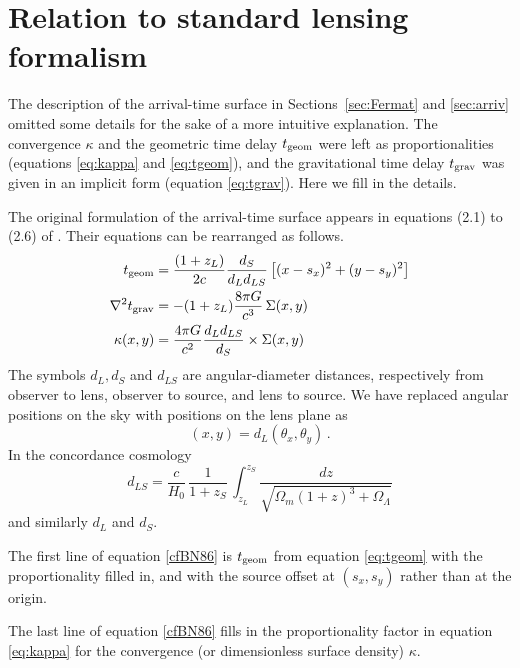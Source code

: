 \documentclass[usenatbib]{mn2e}
\begin{document}
\appendix

\section{Relation to standard lensing formalism}\label{more-theory}

The description of the arrival-time surface in
Sections~\ref{sec:Fermat} and \ref{sec:arriv} omitted some details for
the sake of a more intuitive explanation.  The convergence $\kappa$
and the geometric time delay $t_{\rm geom}$ were left as
proportionalities (equations \ref{eq:kappa} and \ref{eq:tgeom}), and
the gravitational time delay $t_{\rm grav}$ was given in an implicit
form (equation \ref{eq:tgrav}).  Here we fill in the details.

The original formulation of the arrival-time surface appears in
equations (2.1) to (2.6) of \cite{1986ApJ...310..568B}.  Their
equations can be rearranged as follows.
\begin{equation} \label{cfBN86}
\begin{aligned}
t_{\rm geom} &= \frac{(1+z_L)}{2c} \frac{d_S}{d_L d_{LS}}
\left[ (x-s_x)^2 + (y-s_y)^2 \right] \\
\nabla^2 t_{\rm grav} &= -(1+z_L)\frac{8\pi G}{c^3} \, \Sigma(x,y) \\
\kappa(x,y) &= \frac{4\pi G}{c^2} \frac{d_L d_{LS}}{d_S}
               \times \Sigma(x,y)
\end{aligned}
\end{equation}
The symbols $d_L,d_S$ and $d_{LS}$ are angular-diameter distances,
respectively from observer to lens, observer to source, and lens to
source. We have replaced angular positions on the sky with positions
on the lens plane as
\begin{equation}
(x,y) = d_L (\theta_x,\theta_y) \,.
\end{equation}
In the concordance cosmology
\begin{equation}
d_{LS} = \frac{c}{H_0}\,\frac1{1+z_S} \,
\int_{z_L}^{z_S} \!\! \frac{dz}{\sqrt{\Omega_m(1+z)^3 + \Omega_\Lambda}}
\end{equation}
and similarly $d_L$ and $d_S$.

The first line of equation \eqref{cfBN86} is $t_{\rm geom}$ from
equation \eqref{eq:tgeom} with the proportionality filled in, and with
the source offset at $(s_x,s_y)$ rather than at the origin.

The last line of equation \eqref{cfBN86} fills in the proportionality
factor in equation \eqref{eq:kappa} for the convergence (or
dimensionless surface density) $\kappa$.
\end{document}
